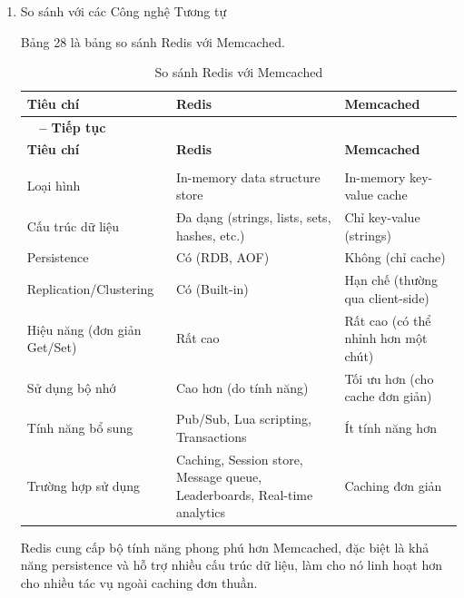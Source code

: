 \begin{enumerate}[label=\arabic*., font=\bfseries]
    \item So sánh với các Công nghệ Tương tự
    
	Bảng 28 là bảng so sánh Redis với Memcached.

    \begin{longtable}{|>{\raggedright\arraybackslash}p{3cm}|>{\centering\arraybackslash}p{3.5cm}|>{\centering\arraybackslash}p{3.5cm}|}
        \caption{So sánh Redis với Memcached}\\
        \hline
        \textbf{Tiêu chí} & \textbf{Redis} & \textbf{Memcached} \\
        \hline \endfirsthead
        \multicolumn{3}{c}%
        {{\bfseries \tablename\ \thetable{} -- Tiếp tục}} \\
        \hline
        \textbf{Tiêu chí} & \textbf{Redis} & \textbf{Memcached} \\
        \hline \endhead
        \hline \multicolumn{3}{r}{{Tiếp tục ở trang sau}} \\ \endfoot
        \hline \endlastfoot
        Loại hình & In-memory data structure store & In-memory key-value cache \\
        \hline
        Cấu trúc dữ liệu & Đa dạng (strings, lists, sets, hashes, etc.) & Chỉ key-value (strings) \\
        \hline
        Persistence & Có (RDB, AOF) & Không (chỉ cache) \\
        \hline
        Replication/Clustering & Có (Built-in) & Hạn chế (thường qua client-side) \\
        \hline
        Hiệu năng (đơn giản Get/Set) & Rất cao & Rất cao (có thể nhỉnh hơn một chút) \\
        \hline
        Sử dụng bộ nhớ & Cao hơn (do tính năng) & Tối ưu hơn (cho cache đơn giản) \\
        \hline
        Tính năng bổ sung & Pub/Sub, Lua scripting, Transactions & Ít tính năng hơn \\
        \hline
        Trường hợp sử dụng & Caching, Session store, Message queue, Leaderboards, Real-time analytics & Caching đơn giản \\
        \hline
    \end{longtable}
    Redis cung cấp bộ tính năng phong phú hơn Memcached, đặc biệt là khả năng persistence và hỗ trợ nhiều cấu trúc dữ liệu, làm cho nó linh hoạt hơn cho nhiều tác vụ ngoài caching đơn thuần.


\end{enumerate}
